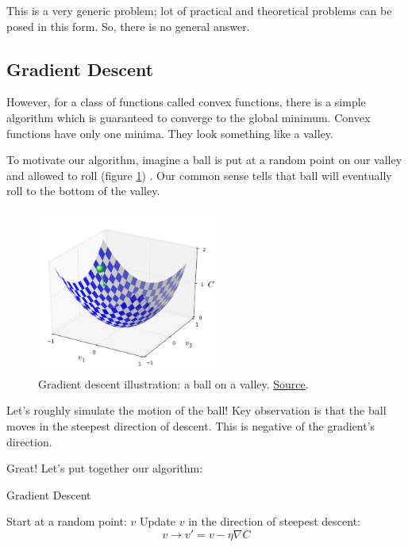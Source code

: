 \documentclass[a4paper]{tufte-handout}
\begin{document}
This is a very generic problem; lot of practical and theoretical
problems can be posed in this form. So, there is no general answer.

\subsection{Gradient Descent}\label{gradient-descent}

However, for a class of functions called convex functions, there is a
simple algorithm which is guaranteed to converge to the global minimum. Convex
functions have only one minima. They look something like a valley.

To motivate our algorithm, imagine a ball
is put at a random point on our valley and allowed to roll (figure \ref{fig:valley}) . Our common
sense tells that ball will eventually roll to the bottom of the valley.

\begin{figure}[htb!]
  \includegraphics[width=60mm]{valley_with_ball}
  \caption{Gradient descent illustration: a ball on a valley.
\href{http://neuralnetworksanddeeplearning.com/chap1.html}{Source}.}
\label{fig:valley}
\end{figure}


Let's roughly simulate the motion of the ball! Key observation is that
the ball moves in the steepest direction of descent. This is negative
of the gradient's direction.

Great! Let's put together our algorithm:


\begin{algorithm}
\caption{Gradient Descent}
\begin{algorithmic}[1]
  \STATE Start at a random point: \(v\)
  \STATE Update \(v\) in the direction of steepest descent: 
      \[v \rightarrow v' = v -\eta \nabla C\]
  \ENDWHILE
\end{algorithmic}
\end{algorithm}
\end{document}
